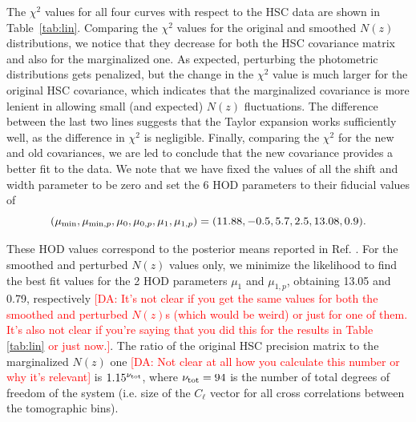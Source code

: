 \documentclass[a4paper,11pt]{article}
\newcommand{\da}[1]{{\textcolor{red}{[DA: #1]}}}
\begin{document}
      The $\chi^2$ values for all four curves with respect to the HSC data are shown in Table~\ref{tab:lin}. Comparing the $\chi^2$ values for the original and smoothed $N(z)$ distributions, we notice that they decrease for both the HSC covariance matrix and also for the marginalized one. As expected, perturbing the photometric distributions gets penalized, but the change in the $\chi^2$ value is much larger for the original HSC covariance, which indicates that the marginalized covariance is more lenient in allowing small (and expected) $N(z)$ fluctuations. The difference between the last two lines suggests that the Taylor expansion works sufficiently well, as the difference in $\chi^2$ is negligible. Finally, comparing the $\chi^2$ for the new and old covariances, we are led to conclude that the new covariance provides a better fit to the data. We note that we have fixed the values of all the shift and width parameter to be zero and set the 6 HOD parameters to their fiducial values of
      \begin{equation}\label{eq:par_fid}
        (\mu_{\rm min},\mu_{{\rm min},p},\mu_0,\mu_{0,p},\mu_1,\mu_{1,p})=(11.88,-0.5,5.7,2.5,13.08,0.9).
      \end{equation}
      
      These HOD values correspond to the posterior means reported in Ref. \cite{1912.08209}. For the smoothed and perturbed $N(z)$ values only, we minimize the likelihood to find the best fit values for the 2 HOD parameters $\mu_1$ and $\mu_{1,p}$, obtaining 13.05 and 0.79, respectively \da{It's not clear if you get the same values for both the smoothed and perturbed $N(z)$s (which would be weird) or just for one of them. It's also not clear if you're saying that you did this for the results in Table \ref{tab:lin} or just now.}. The ratio of  the original HSC precision matrix to the marginalized $N(z)$ one \da{Not clear at all how you calculate this number or why it's relevant} is  $1.15^{\nu_{\rm tot}}$, where $\nu_{\rm tot} = 94$ is the number of total degrees of freedom of the system (i.e. size of the $C_\ell$ vector for all cross correlations between the tomographic bins).
\end{document}
